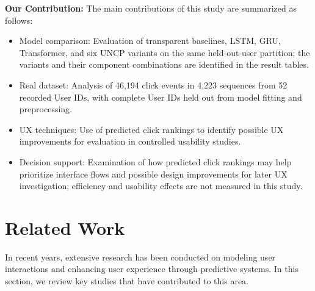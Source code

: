\documentclass[sn-mathphys-num, Numbered]{sn-jnl}%
\theoremstyle{thmstyleone}%
\theoremstyle{thmstyletwo}%
\theoremstyle{thmstylethree}%
\providecommand{\DIFadd}[1]{{\protect\color{green!40!black}#1}} %
\providecommand{\DIFdel}[1]{}                      %
\providecommand{\DIFaddbegin}{} %
\providecommand{\DIFaddend}{} %
\providecommand{\DIFdelbegin}{} %
\providecommand{\DIFdelend}{} %
\newcommand{\DIFscaledelfig}{0.5}
\newlength{\DIFdelgraphicswidth} %
\newlength{\DIFdelgraphicsheight} %
\newcommand{\DIFaddincludegraphics}[2][]{{\color{blue}\fbox{\DIFOincludegraphics[#1]{#2}}}} %
\newcommand{\DIFdelincludegraphics}[2][]{%
\sbox{\DIFdelgraphicsbox}{\DIFOincludegraphics[#1]{#2}}%
\settoboxwidth{\DIFdelgraphicswidth}{\DIFdelgraphicsbox} %
\settoboxtotalheight{\DIFdelgraphicsheight}{\DIFdelgraphicsbox} %
\scalebox{\DIFscaledelfig}{%
\parbox[b]{\DIFdelgraphicswidth}{\usebox{\DIFdelgraphicsbox}\\[-\baselineskip] \rule{\DIFdelgraphicswidth}{0em}}\llap{\resizebox{\DIFdelgraphicswidth}{\DIFdelgraphicsheight}{%
\setlength{\unitlength}{\DIFdelgraphicswidth}%
\begin{picture}(1,1)%
\thicklines\linethickness{2pt} %
{\color[rgb]{1,0,0}\put(0,0){\framebox(1,1){}}}%
{\color[rgb]{1,0,0}\put(0,0){\line( 1,1){1}}}%
{\color[rgb]{1,0,0}\put(0,1){\line(1,-1){1}}}%
\end{picture}%
}\hspace*{3pt}}} %
} %
\DeclareRobustCommand{\DIFaddbegin}{\DIFOaddbegin \let\includegraphics\DIFaddincludegraphics} %
\DeclareRobustCommand{\DIFaddend}{\DIFOaddend \let\includegraphics\DIFOincludegraphics} %
\DeclareRobustCommand{\DIFdelbegin}{\DIFOdelbegin \let\includegraphics\DIFdelincludegraphics} %
\DeclareRobustCommand{\DIFdelend}{\DIFOaddend \let\includegraphics\DIFOincludegraphics} %
\begin{document}
\textbf{Our Contribution:}
The main contributions of this study are summarized as follows:
\begin{itemize}
	\item {Model comparison:} Evaluation of \DIFdelbegin \DIFdel{LSTM and Transformermodels for user click sequence prediction using real-world enterprise app data}\DIFdelend \DIFaddbegin \DIFadd{transparent baselines, LSTM, GRU, Transformer, and six UNCP variants on the same held-out-user partition; the variants and their component combinations are identified in the result tables}\DIFaddend .

	\item {Real dataset:} \DIFdelbegin \DIFdel{Collection and preprocessing of over 35}\DIFdelend \DIFaddbegin \DIFadd{Analysis of 46}\DIFaddend {,}\DIFdelbegin \DIFdel{000 click events from 50 users; achieving 88\% top-3 and 74\% top-1 accuracy with LSTM}\DIFdelend \DIFaddbegin \DIFadd{194 click events in 4}{\DIFadd{,}}\DIFadd{223 sequences from 52 recorded User IDs, with complete User IDs held out from model fitting and preprocessing}\DIFaddend .

	\item {UX techniques:} \DIFdelbegin \DIFdel{Application of click-driven UX evaluation methods, including first-click testing and }\DIFdelend \DIFaddbegin \DIFadd{Use of predicted click rankings to identify possible UX improvements for evaluation in controlled }\DIFaddend usability studies.

	\item {\DIFdelbegin \DIFdel{Practical integration}\DIFdelend \DIFaddbegin \DIFadd{Decision support}\DIFaddend :} \DIFdelbegin \DIFdel{Bridging deep learning with UX design processes to automate and enhance enterprise mobile UI/UX workflows}\DIFdelend \DIFaddbegin \DIFadd{Examination of how predicted click rankings may help prioritize interface flows and possible design improvements for later UX investigation; efficiency and usability effects are not measured in this study}\DIFaddend .
\end{itemize}




\section{ Related Work}

In recent years, extensive research has been conducted on modeling user interactions and enhancing user experience through predictive systems. In this section, we review key studies that have contributed to this area.
\end{document}
